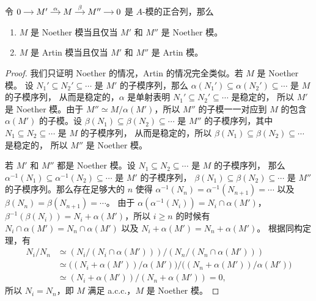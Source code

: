 \begin{proposition}\label{prop:Noether of exact sequence}
  令
  $
    \begin{tikzcd}[cramped,column sep=small]
      0\arrow[r] & M'\arrow[r,"\alpha"] & M\arrow[r,"\beta"] & M''\arrow[r] & 0
    \end{tikzcd}
  $
  是 $A$-模的正合列，那么
  \begin{enumerate}
    \item $M$ 是 Noether 模当且仅当 $M'$ 和 $M''$ 是 Noether 模。
    \item $M$ 是 Artin 模当且仅当 $M'$ 和 $M''$ 是 Artin 模。
  \end{enumerate}
\end{proposition}
\begin{proof}
  我们只证明 Noether 的情况，Artin 的情况完全类似。若 $M$ 是 Noether 模。
  设 $N_1'\subseteq N_2'\subseteq \cdots$ 是 $M'$ 的子模序列，那么 
  $\alpha(N_1')\subseteq \alpha(N_2')\subseteq\cdots$ 是 $M$ 的子模序列，
  从而是稳定的，$\alpha$ 是单射表明 $N_1'\subseteq N_2'\subseteq \cdots$ 是稳定的，
  所以 $M'$ 是 Noether 模。由于 $M''\simeq M/\alpha(M')$，所以 $M''$ 的子模一一对应到
  $M$ 的包含 $\alpha(M')$ 的子模。设 $\beta(N_1)\subseteq\beta(N_2)\subseteq\cdots$
  是 $M''$ 的子模序列，其中 $N_1\subseteq N_2\subseteq \cdots$ 是 $M$ 的子模序列，
  从而是稳定的，所以 $\beta(N_1)\subseteq\beta(N_2)\subseteq\cdots$ 是稳定的，
  所以 $M''$ 是 Noether 模。

  若 $M'$ 和 $M''$ 都是 Noether 模。设 $N_1\subseteq N_2\subseteq\cdots$ 是 $M$ 的子模序列，
  那么 $\alpha^{-1}(N_1)\subseteq\alpha^{-1}(N_2)\subseteq\cdots$ 是 $M'$ 的子模序列，
  $\beta(N_1)\subseteq \beta(N_2)\subseteq\cdots$ 是 $M''$ 的子模序列。那么存在足够大的
  $n$ 使得 $\alpha^{-1}(N_n)=\alpha^{-1}(N_{n+1})=\cdots$ 以及 $\beta(N_n)=\beta(N_{n+1})=\cdots$。
  由于 $\alpha(\alpha^{-1}(N_i))=N_i\cap \alpha(M')$，$\beta^{-1}(\beta(N_i))=N_i+\alpha(M')$，所以
  $i\geq n$ 的时候有 $N_i\cap\alpha(M')=N_n\cap\alpha(M')$ 以及 $N_i+\alpha(M')=N_n+\alpha(M')$。
  根据同构定理，有
  \begin{align*}
    N_i/N_n&\simeq (N_i/(N_i\cap\alpha(M')))\big/(N_n/(N_n\cap\alpha(M')))\\
    &\simeq \bigl((N_i+\alpha(M'))/\alpha(M')\bigr)\big/\bigl((N_n+\alpha(M'))/\alpha(M')\bigr)\\
    &\simeq (N_i+\alpha(M'))/(N_n+\alpha(M'))=0,
  \end{align*}
  所以 $N_i=N_n$，即 $M$ 满足 a.c.c.，$M$ 是 Noether 模。
\end{proof}

